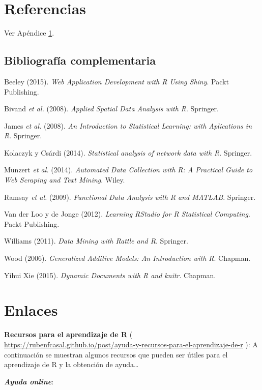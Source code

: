 \documentclass[]{book}
\begin{document}
\chapter*{Referencias}\label{referencias}

Ver Apéndice \ref{links}.

\section*{Bibliografía
complementaria}\label{bibliografia-complementaria}

Beeley (2015). \emph{Web Application Development with R Using Shiny}.
Packt Publishing.

Bivand \emph{et al.} (2008). \emph{Applied Spatial Data Analysis with
R}. Springer.

James \emph{et al.} (2008). \emph{An Introduction to Statistical
Learning: with Aplications in R}. Springer.

Kolaczyk y Csárdi (2014). \emph{Statistical analysis of network data
with R}. Springer.

Munzert \emph{et al.} (2014). \emph{Automated Data Collection with R: A
Practical Guide to Web Scraping and Text Mining}. Wiley.

Ramsay \emph{et al.} (2009). \emph{Functional Data Analysis with R and
MATLAB}. Springer.

Van der Loo y de Jonge (2012). \emph{Learning RStudio for R Statistical
Computing}. Packt Publishing.

Williams (2011). \emph{Data Mining with Rattle and R}. Springer.

Wood (2006). \emph{Generalized Additive Models: An Introduction with R}.
Chapman.

Yihui Xie (2015). \emph{Dynamic Documents with R and knitr}. Chapman.

\appendix


\chapter{Enlaces}\label{links}

\textbf{Recursos para el aprendizaje de R} (
\url{https://rubenfcasal.github.io/post/ayuda-y-recursos-para-el-aprendizaje-de-r}
): A continuación se muestran algunos recursos que pueden ser útiles
para el aprendizaje de R y la obtención de ayuda\ldots{}

\textbf{\emph{Ayuda online}}:
\end{document}
